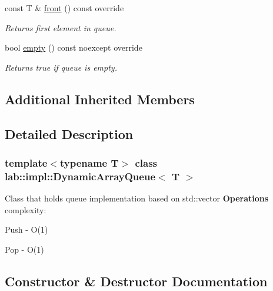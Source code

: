 \begin{DoxyCompactItemize}
const T \& \hyperlink{classlab_1_1impl_1_1DynamicArrayQueue_a1b944916c9b3a1b2c96a21e76e3aa4f0}{front} () const override
\begin{DoxyCompactList}\small\item\em Returns first element in queue. \end{DoxyCompactList}\item 
\mbox{\label{classlab_1_1impl_1_1DynamicArrayQueue_ad882a135dfde4d64fc00cd44c9cd0e5a}} 
bool \hyperlink{classlab_1_1impl_1_1DynamicArrayQueue_ad882a135dfde4d64fc00cd44c9cd0e5a}{empty} () const noexcept override
\begin{DoxyCompactList}\small\item\em Returns true if queue is empty. \end{DoxyCompactList}\end{DoxyCompactItemize}
\subsection*{Additional Inherited Members}


\subsection{Detailed Description}
\subsubsection*{template$<$typename T$>$\newline
class lab\+::impl\+::\+Dynamic\+Array\+Queue$<$ T $>$}

Class that holds queue implementation based on std\+::vector {\bfseries Operations} complexity\+: 

\begin{DoxyItemize}
\item Push -\/ O(1) \item Pop -\/ O(1) \end{DoxyItemize}


\subsection{Constructor \& Destructor Documentation}
\mbox{\label{classlab_1_1impl_1_1DynamicArrayQueue_a1c39ec156dd583bb102839d7b4eec5d6}} 
